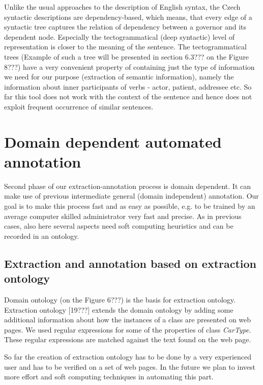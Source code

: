 \documentclass{sig-alternate}
\begin{document}
Unlike the usual approaches to the description of English syntax, the Czech syntactic descriptions are dependency-based, which means, that every edge of a syntactic tree captures the relation of dependency between a governor and its dependent node. Especially the tectogrammatical (deep syntactic) level of representation \cite{biblio:MiBeAnnotationtectogrammatical2006} is closer to the meaning of the sentence. The tectogrammatical trees (Example of such a tree will be presented in section 6.3??? on the Figure 8???) have a very convenient property of containing just the type of information we need for our purpose (extraction of semantic information), namely the information about inner participants of verbs - actor, patient, addressee etc. So far this tool does not work with the context of the sentence and hence does not exploit frequent occurrence of similar sentences.





\section{Domain dependent automated annotation}
Second phase of our extraction-annotation process is domain dependent. It can make use of previous intermediate general (domain independent) annotation. Our goal is to make this process fast and as easy as possible, e.g. to be trained by an average computer skilled administrator very fast and precise. As in previous cases, also here several aspects need soft computing heuristics and can be recorded in an ontology.

\subsection{Extraction and annotation based on extraction ontology}
Domain ontology (on the Figure 6???) is the basis for extraction ontology. Extraction ontology [19???] extends the domain ontology by adding some additional information about how the instances of a class are presented on web pages. We used regular expressions for some of the properties of class \emph{CarType}. These regular expressions are matched against the text found on the web page. 

So far the creation of extraction ontology has to be done by a very experienced user and has to be verified on a set of web pages. In the future we plan to invest more effort and soft computing techniques in automating this part.
\end{document}
